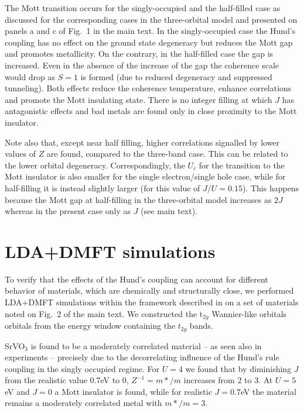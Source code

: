 \documentclass[aps,prl,amsmath, amssymb, english, aps, prl, onecolumn,
  reprint,floatfix, superscriptaddress]{revtex4-1}
\begin{document}
The Mott transition occurs for the singly-occupied and the half-filled
case as discussed for the corresponding cases in the three-orbital
model and presented on panels a and c of Fig.~1 in the main text.  In
the singly-occupied case the Hund's coupling has no effect on the
ground state degeneracy but reduces the Mott gap and promotes
metallicity.  On the contrary, in the half-filled case the gap is
increased. Even in the absence of the increase of the gap the
coherence scale would drop as $S=1$ is formed (due to reduced
degeneracy and suppressed tunneling).  Both effects reduce the
coherence temperature, enhance correlations and promote the Mott
insulating state. There is no integer filling at which $J$ has antagonistic effects and bad metals are found only in close proximity to the Mott
insulator.

Note also that, except near half filling, higher correlations
signalled by lower values of $Z$ are found, compared to the three-band
case. This can be related to the lower orbital degeneracy.
Correspondingly, the $U_c$ for the transition to the Mott
insulator is also smaller for the single electron/single hole case,
while for half-filling it is instead slightly larger (for this value
of $J/U=0.15$).  This happens because the Mott gap at half-filling in the
three-orbital model increases as $2J$ whereas in the present case
only as $J$ (see main text).

\section{LDA+DMFT simulations}

To verify that the effects of the Hund's coupling can account for
different behavior of materials, which are chemically and structurally
close, we performed LDA+DMFT simulations within the framework
described in \cite{aichhorn09} on a set of materials noted on Fig.~2 of
the main text. We constructed the t$_{2g}$  Wannier-like orbitals
orbitals from the energy window containing the $t_{2g}$ bands. 

SrVO$_3$ is found to be a moderately correlated material -- as seen
also in experiments \cite{imada_mit_review} -- precisely due to the
decorrelating influence of the Hund's rule coupling in the singly
occupied regime. For $U=4$ we found that by diminishing $J$ from the
realistic value 0.7eV to 0, $Z^{-1}=m*/m$ increases from 2 to 3. At
$U=5$eV and $J=0$ a Mott insulator is found, while for realistic
$J=0.7$eV the material remains a moderately correlated metal with
$m*/m=3$.
\end{document}
